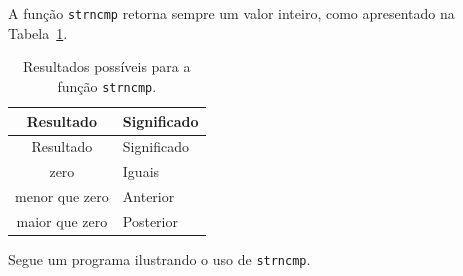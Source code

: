 \documentclass[
  11pt,
  a4paper,
]{scrbook}
\begin{document}
A função \texttt{strncmp} retorna sempre um valor inteiro, como
apresentado na Tabela~\ref{tbl-resultados-strncmp}.

\begin{longtable}[]{@{}cl@{}}
\caption{Resultados possíveis para a função
\texttt{strncmp}.}\label{tbl-resultados-strncmp}\tabularnewline
\toprule\noalign{}
Resultado & Significado \\
\midrule\noalign{}
\endfirsthead
\toprule\noalign{}
Resultado & Significado \\
\midrule\noalign{}
\endhead
\bottomrule\noalign{}
\endlastfoot
zero & Iguais \\
menor que zero & Anterior \\
maior que zero & Posterior \\
\end{longtable}

Segue um programa ilustrando o uso de \texttt{strncmp}.
\end{document}
